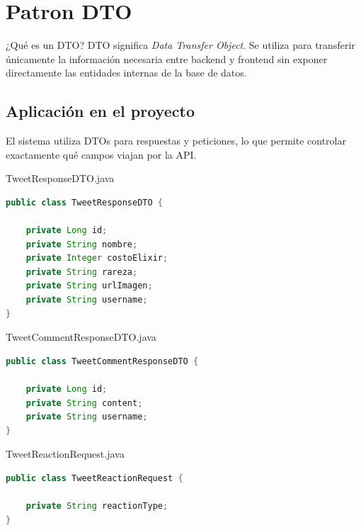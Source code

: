 \documentclass[12pt,a4paper]{article}
\begin{document}
\section{Patron DTO}

\begin{patternbox}{¿Qué es un DTO?}
DTO significa \textit{Data Transfer Object}. Se utiliza para transferir
únicamente la información necesaria entre backend y frontend sin exponer
directamente las entidades internas de la base de datos.
\end{patternbox}

\subsection{Aplicación en el proyecto}

El sistema utiliza DTOs para respuestas y peticiones, lo que permite
controlar exactamente qué campos viajan por la API.

\begin{filebox}{TweetResponseDTO.java}
\begin{lstlisting}[language=Java]
public class TweetResponseDTO {

    private Long id;
    private String nombre;
    private Integer costoElixir;
    private String rareza;
    private String urlImagen;
    private String username;
}
\end{lstlisting}
\end{filebox}

\begin{filebox}{TweetCommentResponseDTO.java}
\begin{lstlisting}[language=Java]
public class TweetCommentResponseDTO {

    private Long id;
    private String content;
    private String username;
}
\end{lstlisting}
\end{filebox}

\begin{filebox}{TweetReactionRequest.java}
\begin{lstlisting}[language=Java]
public class TweetReactionRequest {

    private String reactionType;
}
\end{lstlisting}
\end{filebox}

\end{document}

